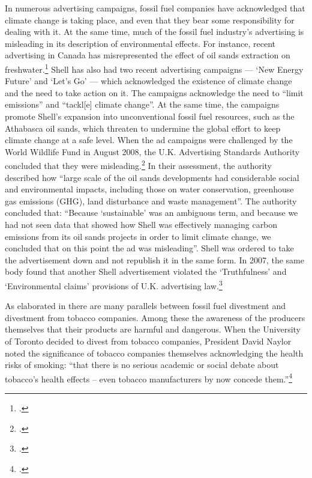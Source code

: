 In numerous advertising campaigns, fossil fuel companies have acknowledged that climate change is taking place, and even that they bear some responsibility for dealing with it.
At the same time, much of the fossil fuel industry's advertising is misleading in its description of environmental effects.
For instance, recent advertising in Canada has misrepresented the effect of oil sands extraction on freshwater.\footcite[][]{PembinaOilAds}
Shell has also had two recent advertising campaigns --- `New Energy Future' and `Let's Go' --- which acknowledged the existence of climate change and the need to take action on it.
The campaigns acknowledge the need to ``limit  emissions'' and ``tackl[e] climate change''.
At the same time, the campaigns promote Shell's expansion into unconventional fossil fuel resources, such as the Athabasca oil sands, which threaten to undermine the global effort to keep climate change at a safe level.
When the ad campaigns were challenged by the World Wildlife Fund in August 2008, the U.K. Advertising Standards Authority concluded that they were misleading.\footcite[][]{ASAversusShell2008}
In their assessment, the authority described how ``large scale of the oil sands developments had considerable social and environmental impacts, including those on water conservation, greenhouse gas emissions (GHG), land disturbance and waste management''.
The authority concluded that: ``Because `sustainable' was an ambiguous term, and because we had not seen data that showed how Shell was effectively managing carbon emissions from its oil sands projects in order to limit climate change, we concluded that on this point the ad was misleading''.
Shell was ordered to take the advertisement down and not republish it in the same form.
In 2007, the same body found that another Shell advertisement violated the `Truthfulness' and `Environmental claims' provisions of U.K. advertising law.\footcite[][]{ASAversusShell2007}



As elaborated in  there are many parallels between fossil fuel divestment and divestment from tobacco companies.
Among these the awareness of the producers themselves that their products are harmful and dangerous.
When the University of Toronto decided to divest from tobacco companies, President David Naylor noted the significance of tobacco companies themselves acknowledging the health risks of smoking: ``that there is no serious academic or social debate about tobacco's health effects – even tobacco manufacturers by now concede them.''\footcite[][]{TStarSellOff}



